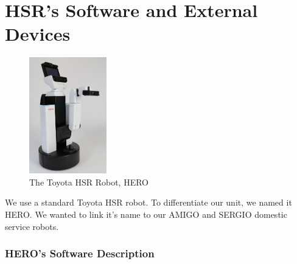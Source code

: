 \section{HSR's Software and External Devices}

\setlength\intextsep{0pt}
\begin{figure}
	\centering
	\includegraphics[width=0.3\textwidth]{Figures/Toyota_HSR}
	\caption{The Toyota\texttrademark\hspace{0em} HSR Robot, HERO}
	\label{fig:hsr}
\end{figure}

We use a standard Toyota\texttrademark\hspace{0em} HSR robot. To differentiate our unit, we named it HERO. We wanted to link it's name to our AMIGO and SERGIO domestic service robots.

\subsubsection{HERO's Software Description}

